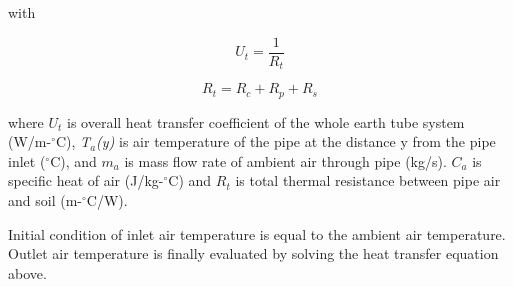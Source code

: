 with

\begin{equation}
{U_t} = \frac{1}{{{R_t}}}
\end{equation}

\begin{equation}
{R_t} = {R_c} + {R_p} + {R_s}
\end{equation}

where \(U_{t}\) is overall heat transfer coefficient of the whole earth tube system (W/m-\(^{\circ}\)C), \emph{T\(_{a}\)(y)} is air temperature of the pipe at the distance y from the pipe inlet (\(^{\circ}\)C), and \(m_{a}\) is mass flow rate of ambient air through pipe (kg/s).  \(C_{a}\) is specific heat of air (J/kg-\(^{\circ}\)C) and \(R_{t}\) is total thermal resistance between pipe air and soil (m-\(^{\circ}\)C/W).

Initial condition of inlet air temperature is equal to the ambient air temperature. Outlet air temperature is finally evaluated by solving the heat transfer equation above.

